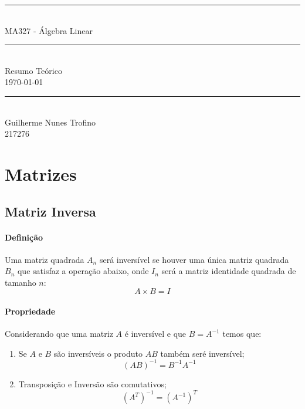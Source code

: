 \documentclass{article}
\begin{document}
\begin{titlepage}
    \begin{center}
        \rule{450pt}{0.5pt}\\[4mm]
        {\Huge MA327 - Álgebra Linear}\\
        \rule{450pt}{0.5pt}\\[2mm]
        {\Large Resumo Teórico}\\[198mm]
        \today\\
        \rule{250pt}{0.5pt}\\
        {\large Guilherme Nunes Trofino}\\
        {\large 217276}\\
    \end{center}
\end{titlepage}
\newpage

    \tableofcontents
\newpage

    \section{Matrizes}
        \subsection{Matriz Inversa}
            \paragraph{Definição}Uma matriz quadrada $A_{n}$ será inversível se houver uma única matriz quadrada $B_{n}$ que satisfaz a operação abaixo, onde $I_{n}$ será a matriz identidade quadrada de tamanho $n$:
                \[\boxed{A \times B = I}\]

            \paragraph{Propriedade}Considerando que uma matriz $A$ é inversível e que $B = A^{-1}$ temos que:
                \begin{enumerate}
                    \item Se $A$ e $B$ são inversíveis o produto $AB$ também seré inversível;
                        \[\boxed{(AB)^{-1} = B^{-1}A^{-1}}\]
                    \item Transposição e Inversão são comutativos;
                        \[\boxed{(A^{T})^{-1} = (A^{-1})^{T}}\]
                \end{enumerate}
                
\end{document}

